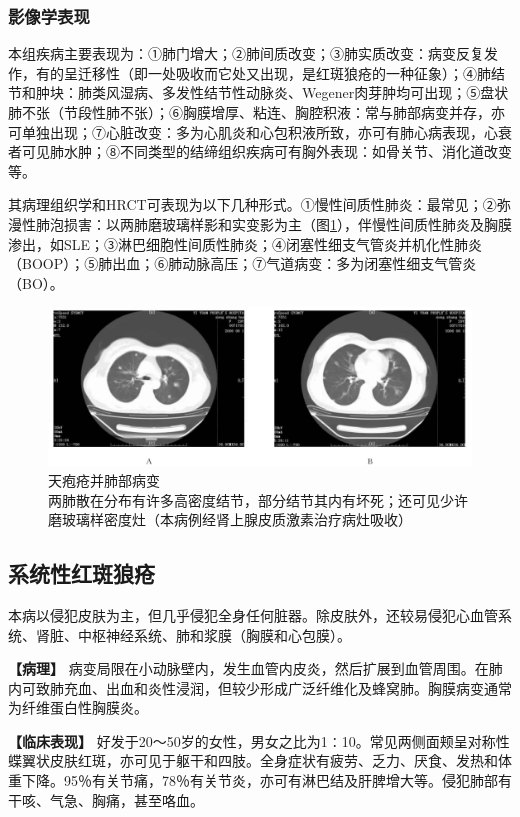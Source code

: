 \subsubsection{影像学表现}

本组疾病主要表现为：①肺门增大；②肺间质改变；③肺实质改变：病变反复发作，有的呈迁移性（即一处吸收而它处又出现，是红斑狼疮的一种征象）；④肺结节和肿块：肺类风湿病、多发性结节性动脉炎、Wegener肉芽肿均可出现；⑤盘状肺不张（节段性肺不张）；⑥胸膜增厚、粘连、胸腔积液：常与肺部病变并存，亦可单独出现；⑦心脏改变：多为心肌炎和心包积液所致，亦可有肺心病表现，心衰者可见肺水肿；⑧不同类型的结缔组织疾病可有胸外表现：如骨关节、消化道改变等。

其病理组织学和HRCT可表现为以下几种形式。①慢性间质性肺炎：最常见；②弥漫性肺泡损害：以两肺磨玻璃样影和实变影为主（图\ref{fig9-37}），伴慢性间质性肺炎及胸膜渗出，如SLE；③淋巴细胞性间质性肺炎；④闭塞性细支气管炎并机化性肺炎（BOOP）；⑤肺出血；⑥肺动脉高压；⑦气道病变：多为闭塞性细支气管炎（BO）。

\begin{figure}[!htbp]
 \centering
 \includegraphics[width=.7\textwidth,height=\textheight,keepaspectratio]{./images/Image00228.jpg}
 \captionsetup{justification=centering}
 \caption{天疱疮并肺部病变\\{\small 两肺散在分布有许多高密度结节，部分结节其内有坏死；还可见少许磨玻璃样密度灶（本病例经肾上腺皮质激素治疗病灶吸收）}}
 \label{fig9-37}
  \end{figure} 

\subsection{系统性红斑狼疮}

本病以侵犯皮肤为主，但几乎侵犯全身任何脏器。除皮肤外，还较易侵犯心血管系统、肾脏、中枢神经系统、肺和浆膜（胸膜和心包膜）。

\textbf{【病理】}
病变局限在小动脉壁内，发生血管内皮炎，然后扩展到血管周围。在肺内可致肺充血、出血和炎性浸润，但较少形成广泛纤维化及蜂窝肺。胸膜病变通常为纤维蛋白性胸膜炎。

\textbf{【临床表现】}
好发于20～50岁的女性，男女之比为1∶10。常见两侧面颊呈对称性蝶翼状皮肤红斑，亦可见于躯干和四肢。全身症状有疲劳、乏力、厌食、发热和体重下降。95％有关节痛，78％有关节炎，亦可有淋巴结及肝脾增大等。侵犯肺部有干咳、气急、胸痛，甚至咯血。


